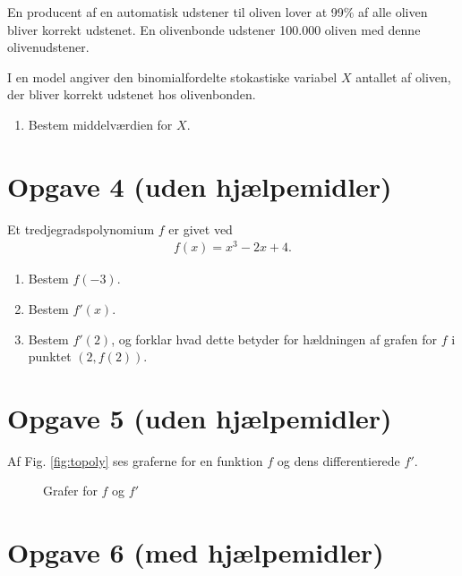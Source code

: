 En producent af en automatisk udstener til oliven lover at 99$\%$ af alle oliven bliver korrekt udstenet. En olivenbonde udstener 100.000 oliven med denne olivenudstener. 

I en model angiver den binomialfordelte stokastiske variabel $X$ antallet af oliven, der bliver korrekt udstenet hos olivenbonden.
\begin{enumerate}[label=\roman*)]
\item Bestem middelværdien for $X$. 
\end{enumerate}

\section*{Opgave 4 (uden hjælpemidler)}

Et tredjegradspolynomium $f$ er givet ved
\begin{align*}
f(x) = x^3-2x+4.
\end{align*}
\begin{enumerate}[label=\roman*)]
\item Bestem $f(-3)$.
\item Bestem $f'(x)$.
\item Bestem $f'(2)$, og forklar hvad dette betyder for hældningen af grafen for $f$ i punktet $(2,f(2))$. 
\end{enumerate}


\section*{Opgave 5 (uden hjælpemidler)}
Af Fig. \ref{fig:topoly} ses graferne for en funktion $f$ og dens differentierede $f'$. 
\begin{figure}[H]
\centering
{}
\caption{Grafer for $f$ og $f'$}
\end{figure}

\section*{Opgave 6 (med hjælpemidler)}


